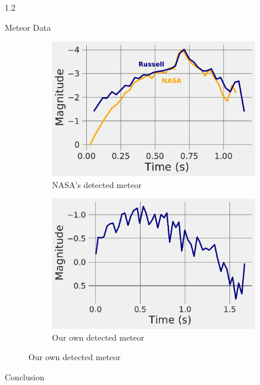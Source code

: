 \documentclass[final]{beamer}
\newlength{\twocolwid}
\begin{document}
\begin{frame}[t]
\begin{columns}[t]
\begin{column}{1.2\twocolwid}
\begin{alertblock}{Meteor Data}
\begin{figure}
\centering
\begin{subfigure}{.5\textwidth}
  \centering
  \includegraphics[width=\linewidth]{LightComparison0.pdf}
  \caption{NASA's detected meteor}
  \label{fig:sub1}
\end{subfigure}%
\begin{subfigure}{.5\textwidth}
  \centering
  \includegraphics[width=\linewidth]{D6Curve.pdf}
  \caption{Our own detected meteor}
  \label{fig:sub2}
\end{subfigure}
\label{fig:test}
\end{figure}

\end{alertblock}



\begin{block}{Conclusion}


\end{block}
\end{column}
\end{columns}
\end{frame}
\end{document}
